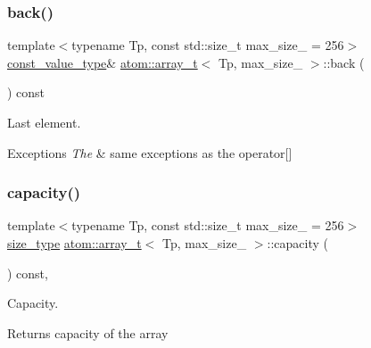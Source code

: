 \subsubsection{\texorpdfstring{back()}{back()}}
{\footnotesize\ttfamily template$<$typename Tp, const std\+::size\+\_\+t max\+\_\+size\+\_\+ = 256$>$ \\
\hyperlink{classatom_1_1array__t_a9c33ee3fb4e5b4d57c7801a8f69ada14}{const\+\_\+value\+\_\+type}\& \hyperlink{classatom_1_1array__t}{atom\+::array\+\_\+t}$<$ Tp, max\+\_\+size\+\_\+ $>$\+::back (\begin{DoxyParamCaption}{ }\end{DoxyParamCaption}) const\hspace{0.3cm}{\ttfamily [inline]}}



Last element. 


\begin{DoxyExceptions}{Exceptions}
{\em The} & same exceptions as the operator\mbox{[}\mbox{]} \\
\hline
\end{DoxyExceptions}
\mbox{\label{classatom_1_1array__t_a83235683c8ca9bceb07d050ae1efe767}} 
\subsubsection{\texorpdfstring{capacity()}{capacity()}}
{\footnotesize\ttfamily template$<$typename Tp, const std\+::size\+\_\+t max\+\_\+size\+\_\+ = 256$>$ \\
\hyperlink{classatom_1_1array__t_a8534f23c7f0082698cbd708e1f2e26ff}{size\+\_\+type} \hyperlink{classatom_1_1array__t}{atom\+::array\+\_\+t}$<$ Tp, max\+\_\+size\+\_\+ $>$\+::capacity (\begin{DoxyParamCaption}{ }\end{DoxyParamCaption}) const\hspace{0.3cm}{\ttfamily [inline]}, {\ttfamily [noexcept]}}



Capacity. 

\begin{DoxyReturn}{Returns}
capacity of the array 
\end{DoxyReturn}
\mbox{\label{classatom_1_1array__t_a3e133e59958e8638b0f6d7a74b9890d6}} 
